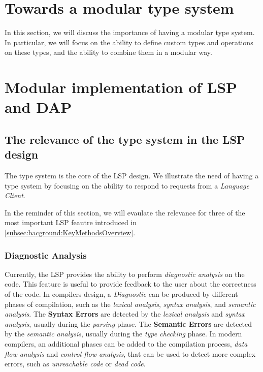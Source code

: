 \section{Towards a modular type system}\label{sec:concept:TowardsAModularTypeSystem}

In this section, we will discuss the importance of having a modular type system. In particular, we will focus on the ability to define custom types and operations on these types, and the ability to combine them in a modular way.



\section{Modular implementation of LSP and DAP}\label{sec:concept:ModularImplementationOfLSPAndDAP}

\subsection{The relevance of the type system in the LSP design}\label{subsec:concept:RelevanceOfTheTypeSystem}

The type system is the core of the LSP design. We illustrate the need of having a type system by focusing on the ability to respond to requests from a \textit{Language Client}.

In the reminder of this section, we will evaulate the relevance for three of the most important LSP feautre introduced in \ref{subsec:bacground:KeyMethodsOverview}.

\subsubsection{Diagnostic Analysis}\label{subsubsec:concept:DiagnosticAnalysis}

Currently, the LSP provides the ability to perform \textit{diagnostic analysis} on the code. This feature is useful to provide feedback to the user about the correctness of the code.
In compilers design, a \textit{Diagnostic} can be produced by different phases of compilation, such as the \textit{lexical analysis}, \textit{syntax analysis}, and \textit{semantic analysis}.
The \textbf{Syntax Errors} are detected by the \textit{lexical analysis} and \textit{syntax analysis}, usually during the \textit{parsing} phase. The \textbf{Semantic Errors} are detected by the \textit{semantic analysis}, usually during the \textit{type checking} phase.
In modern compilers, an additional phases can be added to the compilation process, \textit{data flow analysis} and \textit{control flow analysis}, that can be used to detect more complex errors, such as \textit{unreachable code} or \textit{dead code}.

